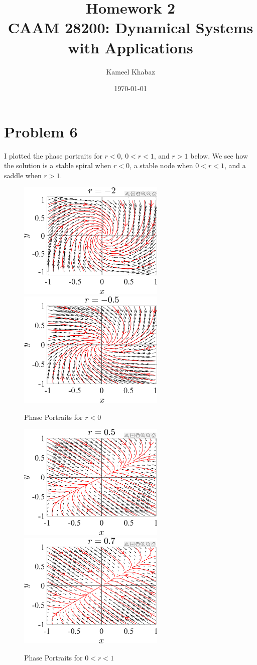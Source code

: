 \documentclass[11pt]{article}
\title{Homework 2 \large \\ CAAM 28200: Dynamical Systems with Applications}
\author{Kameel Khabaz}
\date{\today}
\begin{document}
\maketitle

\section*{Problem 6}
I plotted the phase portraits for $r < 0$, $0<r<1$, and $r>1$ below. We see how the solution is a stable spiral when $r < 0$, a stable node when $0<r<1$, and a saddle when $r>1$.
\begin{figure}[h]
\centering
\includegraphics[width=7cm]{phase_portrait_r_-2}
\includegraphics[width=7cm]{phase_portrait_r_-0_5}
\caption{Phase Portraits for $r < 0$}
\end{figure}

\begin{figure}[h]
\centering
\includegraphics[width=7cm]{phase_portrait_r_0_5}
\includegraphics[width=7cm]{phase_portrait_r_0_7}
\caption{Phase Portraits for $0<r<1$}
\end{figure}
\end{document}
